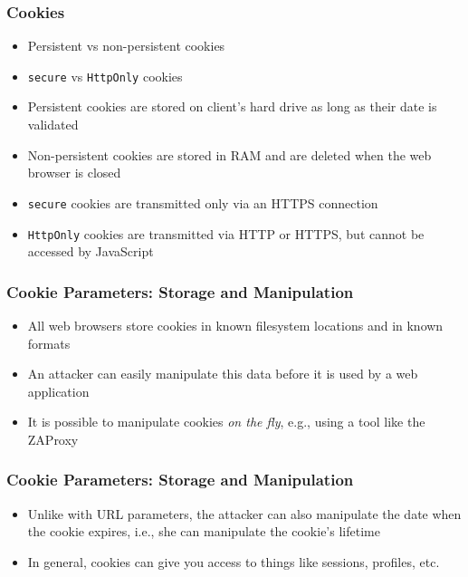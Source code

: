 \begin{frame}[fragile]
    \frametitle{Cookies}
    \begin{itemize}
        \item Persistent vs non-persistent cookies
        \item \verb|secure| vs \verb|HttpOnly| cookies
        \item Persistent cookies are stored on client's hard drive as long as their date is validated
        \item Non-persistent cookies are stored in RAM and are deleted when the web browser is closed
        \item \verb|secure| cookies are transmitted only via an HTTPS connection
        \item \verb|HttpOnly| cookies are transmitted via HTTP or HTTPS, but cannot be accessed by JavaScript
    \end{itemize}
\end{frame}

\begin{frame}
    \frametitle{Cookie Parameters: Storage and Manipulation}
    \begin{itemize}
        \item All web browsers store cookies in known filesystem locations and in known formats
        \item An attacker can easily manipulate this data before it is used by a web application
        \item It is possible to manipulate cookies \textit{on the fly}, e.g., using a tool like the ZAProxy
    \end{itemize}
\end{frame}

\begin{frame}
    \frametitle{Cookie Parameters: Storage and Manipulation}
    \begin{itemize}
        \item Unlike with URL parameters, the attacker can also manipulate the date when the cookie expires, i.e., she can manipulate the cookie's lifetime
        \item In general, cookies can give you access to things like sessions, profiles, etc.
    \end{itemize}
\end{frame}

